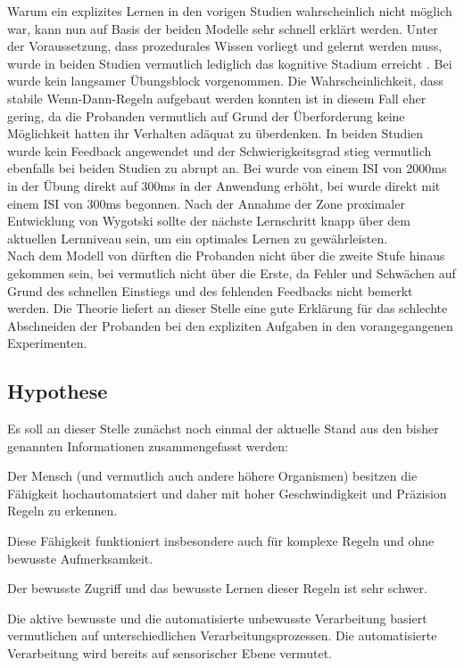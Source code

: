 \documentclass[doc,a4paper,12pt]{apa6}
\begin{document}
Warum ein explizites Lernen in den vorigen Studien \parencites{bendixen2008rapid}{paavilainen2007preattentive} wahrscheinlich nicht möglich war, kann nun auf Basis der beiden Modelle sehr schnell erklärt werden. Unter der Voraussetzung, dass prozedurales Wissen vorliegt und gelernt werden muss, wurde in beiden Studien vermutlich lediglich das kognitive Stadium erreicht \parencite[nach][]{fitts1967human}. Bei \textcite{bendixen2008rapid} wurde kein langsamer Übungsblock vorgenommen. Die Wahrscheinlichkeit, dass stabile Wenn-Dann-Regeln aufgebaut werden konnten ist in diesem Fall eher gering, da die Probanden vermutlich auf Grund der Überforderung keine Möglichkeit hatten ihr Verhalten adäquat zu überdenken. In beiden Studien wurde kein Feedback angewendet und der Schwierigkeitsgrad stieg vermutlich ebenfalls bei beiden Studien zu abrupt an. Bei \textcite{paavilainen2007preattentive} wurde von einem ISI von 2000ms in der Übung direkt auf 300ms in der Anwendung erhöht, bei \textcite{bendixen2008rapid} wurde direkt mit einem ISI von 300ms begonnen. Nach der Annahme der Zone proximaler Entwicklung von Wygotski \parencite{kozulin2003vygotsky} sollte der nächste Lernschritt knapp über dem aktuellen Lernniveau sein, um ein optimales Lernen zu gewährleisten.\\
Nach dem Modell von \textcite{whitmore2009coaching} dürften die Probanden nicht über die zweite Stufe hinaus gekommen sein, bei \textcite{bendixen2008rapid} vermutlich nicht über die Erste, da Fehler und Schwächen auf Grund des schnellen Einstiegs und des fehlenden Feedbacks nicht bemerkt werden. Die Theorie liefert an dieser Stelle eine gute Erklärung für das schlechte Abschneiden der Probanden bei den expliziten Aufgaben in den vorangegangenen Experimenten.

\subsection{Hypothese}

Es soll an dieser Stelle zunächst noch einmal der aktuelle Stand aus den bisher genannten Informationen zusammengefasst werden:

\begin{compactitem}
\item Der Mensch (und vermutlich auch andere höhere Organismen) besitzen die Fähigkeit hochautomatsiert und daher mit hoher Geschwindigkeit und Präzision Regeln zu erkennen.
\item Diese Fähigkeit funktioniert insbesondere auch für komplexe Regeln und ohne bewusste Aufmerksamkeit.
\item Der bewusste Zugriff und das bewusste Lernen dieser Regeln ist sehr schwer.
\item Die aktive bewusste und die automatisierte unbewusste Verarbeitung basiert vermutlichen auf unterschiedlichen Verarbeitungsprozessen. Die automatisierte Verarbeitung wird bereits auf sensorischer Ebene vermutet.
\end{compactitem}
\end{document}
